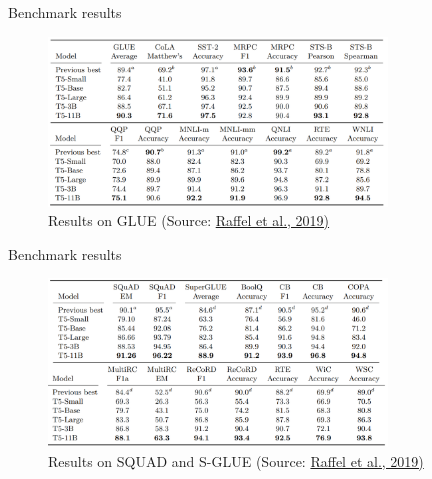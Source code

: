 
\begin{frame}{Benchmark results}

\vfill

	\begin{figure}
		\centering
		\includegraphics[width = 9cm]{figure/t5-glue.png}\\ 
		\footnotesize{Results on GLUE (Source:} \href{https://arxiv.org/pdf/1910.10683.pdf}{\footnotesize Raffel et al., 2019)}
	\end{figure}
	
\vfill

\end{frame}


\begin{frame}{Benchmark results}

\vfill

	\begin{figure}
		\centering
		\includegraphics[width = 9cm]{figure/t5-squad-sglue.png}\\ 
		\footnotesize{Results on SQUAD and S-GLUE (Source:} \href{https://arxiv.org/pdf/1910.10683.pdf}{\footnotesize Raffel et al., 2019)}
	\end{figure}
	
\vfill

\end{frame}


